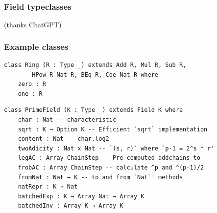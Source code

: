 \documentclass[options]{beamer}
\begin{document}
\begin{frame}
    \frametitle{Field typeclasses}


    (thanks ChatGPT)

\end{frame}

\begin{frame}[fragile]
    \frametitle{Example classes}

\begin{verbatim}
class Ring (R : Type _) extends Add R, Mul R, Sub R, 
        HPow R Nat R, BEq R, Coe Nat R where
    zero : R
    one : R
\end{verbatim}

\begin{verbatim}
class PrimeField (K : Type _) extends Field K where
    char : Nat -- characteristic
    sqrt : K → Option K -- Efficient `sqrt` implementation
    content : Nat -- char.log2
    twoAdicity : Nat x Nat -- `(s, r)` where `p-1 = 2^s * r'
    legAC : Array ChainStep -- Pre-computed addchains to
    frobAC : Array ChainStep -- calculate ^p and ^(p-1)/2
    fromNat : Nat → K -- to and from `Nat`' methods
    natRepr : K → Nat
    batchedExp : K → Array Nat → Array K
    batchedInv : Array K → Array K
\end{verbatim}

\end{frame}
\end{document}

